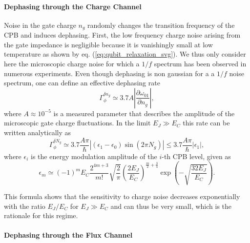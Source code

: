 \paragraph{Dephasing through the Charge Channel}

Noise in the gate charge $n_g$ randomly changes  the transition frequency of the CPB and induces dephasing.
First,  the low frequency charge noise arising from the  gate impedance is negligible because   it is vanishingly small at low temperature
   as shown by   eq. (\ref{eq:qubit_relaxation_svg}). We thus only consider here  the  microscopic charge noise for which a $1/f$ spectrum has been 
observed in numerous experiments. Even though dephasing is non gaussian for a a $1/f$ noise spectrum,  one can define an effective  dephasing rate  \citep{cottet_implementation_2002,van_harlingen_decoherence_2004}
%
\begin{equation}
\Gamma_\phi^{\delta n_g} \simeq 3.7A \left|\frac{\partial \omega_{01}}{\partial n_g}\right|,
\end{equation}
%
where $A\approx 10^{-5}$ is a measured parameter that describes the amplitude of the microscopic gate charge fluctuations. In the limit $E_J\gg E_C$ this rate can be written analytically as
%
\begin{equation}
\Gamma_\phi^{\delta N_g} \simeq 3.7\frac{A\pi}{\hbar}\left| (\epsilon_1-\epsilon_0)\sin{\left(2\pi N_g\right)}\right| \leq 3.7\frac{A\pi}{\hbar}|\epsilon_1|,
\end{equation}
%
where $\epsilon_i$ is the energy modulation amplitude of the $i$-th CPB level, given as \citep{koch_charge-insensitive_2007}
%
\begin{equation}
\epsilon_m\simeq (-1)^m E_C\frac{2^{4m+3}}{m!}\sqrt{\frac{2}{\pi}}\left(\frac{2E_J}{E_C}\right)^{\frac{m}{2}+\frac{3}{4}}\exp{\left(-\sqrt{\frac{32E_J}{E_C}}\right)}. \label{eq:charge_dephasing_rate}
\end{equation}
%

This  formula shows that the sensitivity   to charge noise decreases exponentially with the ratio $E_J/E_C$ for $E_J \gg E_C$  and can thus be very small, which is the rationale for this regime.   

\paragraph{Dephasing through the Flux Channel}

